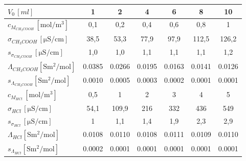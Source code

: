 \begin{tabular}{
    l
    c
    c
    c
    c
    c
    c
} \toprule
$V_0\, [\si{ml}]$                                               & 1      & 2      & 4      & 6      & 8      & 10     \\ \midrule
$c_{M_{CH_3COOH}}\, [\si{\mole\per\cubic\metre}]$               & 0,1    & 0,2    & 0,4    & 0,6    & 0,8    & 1      \\
$\sigma_{CH_3COOH}\, [\si{\micro\siemens\per\centi\metre}]$     & 38,5   & 53,3   & 77,9   & 97,9   & 112,5  & 126,2  \\
$s_{\sigma_{CH_3COOH}}\, [\si{\micro\siemens\per\centi\metre}]$ & 1,0    & 1,0    & 1,1    & 1,1    & 1,1    & 1,2    \\
$\Lambda_{CH_3COOH} [\si{\siemens\metre\squared\per\mole}]$     & 0.0385 & 0.0266 & 0.0195 & 0.0163 & 0.0141 & 0.0126 \\
$s_{\Lambda_{CH_3COOH}} [\si{\siemens\metre\squared\per\mole}]$ & 0.0010 & 0.0005 & 0.0003 & 0.0002 & 0.0001 & 0.0001 \\ \midrule[0.3pt]
$c_{M_{HCl}}\, [\si{\mole\per\cubic\metre}]$                    & 0,5    & 1      & 2      & 3      & 4      & 5      \\
$\sigma_{HCl}\, [\si{\micro\siemens\per\centi\metre}]$          & 54,1   & 109,9  & 216    & 332    & 436    & 549    \\
$s_{\sigma_{HCl}}\, [\si{\micro\siemens\per\centi\metre}]$      & 1      & 1,1    & 1,4    & 1,9    & 2,3    & 2,9    \\
$\Lambda_{HCl} [\si{\siemens\metre\squared\per\mole}]$          & 0.0108 & 0.0110 & 0.0108 & 0.0111 & 0.0109 & 0.0110 \\
$s_{\Lambda_{HCl}} [\si{\siemens\metre\squared\per\mole}]$      & 0.0002 & 0.0001 & 0.0001 & 0.0001 & 0.0001 & 0.0001 \\ \bottomrule
\end{tabular}
